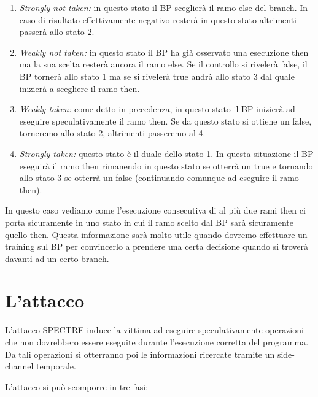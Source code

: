 			\begin{enumerate}
				\item \emph{Strongly not taken:} in questo stato il \ac{BP} sceglierà il ramo else del branch. In caso di risultato effettivamente negativo resterà in questo stato altrimenti passerà allo stato 2.
				\item \emph{Weakly not taken:} in questo stato il \ac{BP} ha già osservato una esecuzione then ma la sua scelta resterà ancora il ramo else. Se il controllo si rivelerà false, il \ac{BP} tornerà allo stato 1 ma se si rivelerà true andrà allo stato 3 dal quale inizierà a scegliere il ramo then.
				\item \emph{Weakly taken:} come detto in precedenza, in questo stato il \ac{BP} inizierà ad eseguire speculativamente il ramo then. Se da questo stato si ottiene un false, torneremo allo stato 2, altrimenti passeremo al 4.
				\item \emph{Strongly taken:} questo stato è il duale dello stato 1. In questa situazione il \ac{BP} eseguirà il ramo then rimanendo in questo stato se otterrà un true e tornando allo stato 3 se otterrà un false (continuando comunque ad eseguire il ramo then).
			\end{enumerate}
		
			In questo caso vediamo come l'esecuzione consecutiva di al più due rami then ci porta sicuramente in uno stato in cui il ramo scelto dal \ac{BP} sarà sicuramente quello then. Questa informazione sarà molto utile quando dovremo effettuare un training sul \ac{BP} per convincerlo a prendere una certa decisione quando si troverà davanti ad un certo branch.
			
	\section{L'attacco}
		L'attacco SPECTRE induce la vittima ad eseguire speculativamente operazioni che non dovrebbero essere eseguite durante l'esecuzione corretta del programma. Da tali operazioni si otterranno poi le informazioni ricercate tramite un side-channel temporale.
		
		L'attacco si può scomporre in tre fasi:
		
